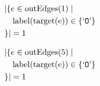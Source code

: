 \begin{align*}
&|\{e \in \mathrm{outEdges}(1)  \mid \\
&\quad \mathrm{label}(\mathrm{target}(e)) \in \{ \text{`\texttt{O}'} \}\\
&\}| = 1
\end{align*}

\begin{align*}
&|\{e \in \mathrm{outEdges}(5)  \mid \\
&\quad \mathrm{label}(\mathrm{target}(e)) \in \{ \text{`\texttt{O}'} \}\\
&\}| = 1
\end{align*}

